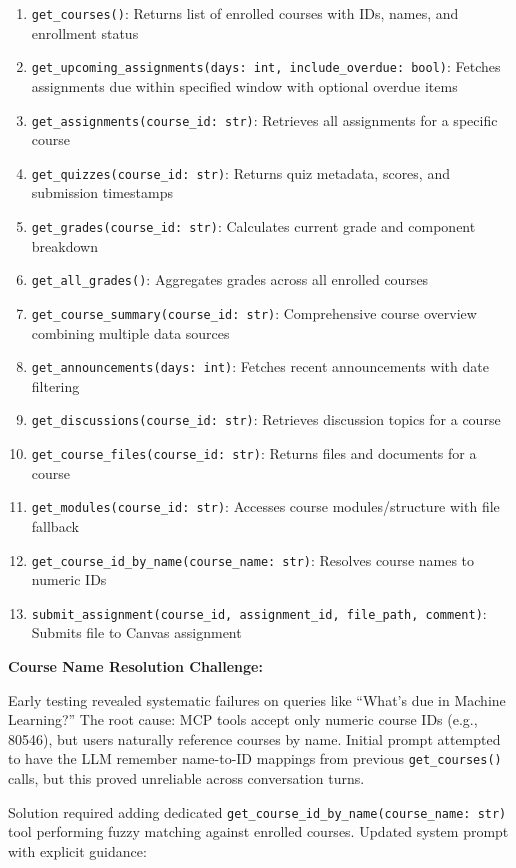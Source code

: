 \documentclass{article}
\begin{document}
\begin{enumerate}
    \item \texttt{get\_courses()}: Returns list of enrolled courses with IDs, names, and enrollment status
    \item \texttt{get\_upcoming\_assignments(days: int, include\_overdue: bool)}: Fetches assignments due within specified window with optional overdue items
    \item \texttt{get\_assignments(course\_id: str)}: Retrieves all assignments for a specific course
    \item \texttt{get\_quizzes(course\_id: str)}: Returns quiz metadata, scores, and submission timestamps
    \item \texttt{get\_grades(course\_id: str)}: Calculates current grade and component breakdown
    \item \texttt{get\_all\_grades()}: Aggregates grades across all enrolled courses
    \item \texttt{get\_course\_summary(course\_id: str)}: Comprehensive course overview combining multiple data sources
    \item \texttt{get\_announcements(days: int)}: Fetches recent announcements with date filtering
    \item \texttt{get\_discussions(course\_id: str)}: Retrieves discussion topics for a course
    \item \texttt{get\_course\_files(course\_id: str)}: Returns files and documents for a course
    \item \texttt{get\_modules(course\_id: str)}: Accesses course modules/structure with file fallback
    \item \texttt{get\_course\_id\_by\_name(course\_name: str)}: Resolves course names to numeric IDs
    \item \texttt{submit\_assignment(course\_id, assignment\_id, file\_path, comment)}: Submits file to Canvas assignment
\end{enumerate}

\textbf{Course Name Resolution Challenge:}

Early testing revealed systematic failures on queries like ``What's due in Machine Learning?'' The root cause: MCP tools accept only numeric course IDs (e.g., 80546), but users naturally reference courses by name. Initial prompt attempted to have the LLM remember name-to-ID mappings from previous \texttt{get\_courses()} calls, but this proved unreliable across conversation turns.

Solution required adding dedicated \texttt{get\_course\_id\_by\_name(course\_name: str)} tool performing fuzzy matching against enrolled courses. Updated system prompt with explicit guidance:
\end{document}
